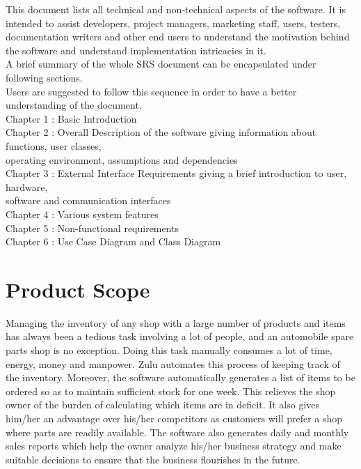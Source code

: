 \documentclass{scrreprt}
\begin{document}
This document lists all technical and non-technical aspects of the software. It is intended to assist developers, project managers, marketing staff, users, testers, documentation writers and other end users to understand the motivation behind the software and understand implementation intricacies in it.\\
A brief summary of the whole SRS document can be encapsulated under following sections.\\
Users are suggested to follow this sequence in order to have a better
understanding of the document.\\
Chapter 1 : Basic Introduction\\
Chapter 2 : Overall Description of the software giving information about functions, user classes,\\ \hspace*{1.9cm} operating environment, assumptions and dependencies\\
Chapter 3 : External Interface Requirements giving a brief introduction to user, hardware,\\ \hspace*{1.9cm} software and communication interfaces\\
Chapter 4 : Various system features\\
Chapter 5 : Non-functional requirements \\
Chapter 6 : Use Case Diagram and Class Diagram

\section{Product Scope}

Managing the inventory of any shop with a large number of products and items has always been a tedious task involving a lot of people, and an automobile spare parts shop is no exception. Doing this task manually consumes a lot of time, energy, money and manpower. Zulu automates this process of keeping track of the inventory. Moreover, the software automatically generates a list of items to be ordered so as to maintain sufficient stock for one week. This relieves the shop owner of the burden of calculating which items are in deficit. It also gives him/her an advantage over his/her competitors as customers will prefer a shop where parts are readily available. The software also generates daily and monthly sales reports which help the owner analyze his/her business strategy and make suitable decisions to ensure that the business flourishes in the future.
\end{document}
